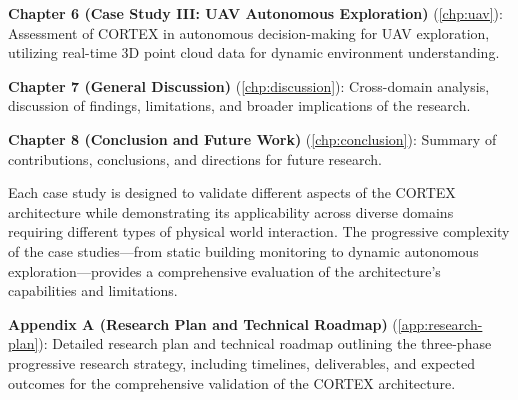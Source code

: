 \textbf{Chapter 6 (Case Study III: UAV Autonomous Exploration)} (\autoref{chp:uav}): Assessment of CORTEX in autonomous decision-making for UAV exploration, utilizing real-time 3D point cloud data for dynamic environment understanding.

\textbf{Chapter 7 (General Discussion)} (\autoref{chp:discussion}): Cross-domain analysis, discussion of findings, limitations, and broader implications of the research.

\textbf{Chapter 8 (Conclusion and Future Work)} (\autoref{chp:conclusion}): Summary of contributions, conclusions, and directions for future research.

Each case study is designed to validate different aspects of the CORTEX architecture while demonstrating its applicability across diverse domains requiring different types of physical world interaction. The progressive complexity of the case studies—from static building monitoring to dynamic autonomous exploration—provides a comprehensive evaluation of the architecture's capabilities and limitations.

\textbf{Appendix A (Research Plan and Technical Roadmap)} (\autoref{app:research-plan}): Detailed research plan and technical roadmap outlining the three-phase progressive research strategy, including timelines, deliverables, and expected outcomes for the comprehensive validation of the CORTEX architecture.